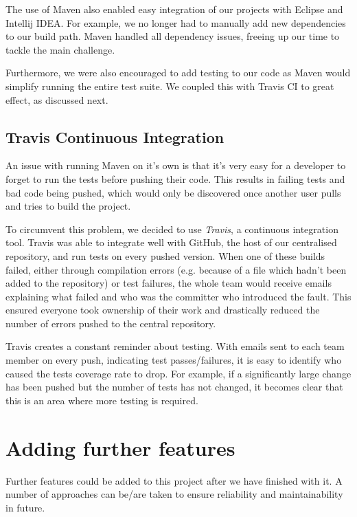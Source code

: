 \documentclass[a4paper]{article}
\begin{document}
The use of Maven also enabled easy integration of our projects with Eclipse and Intellij IDEA. For example, we no longer had to manually add new dependencies to our build path. Maven handled all dependency issues, freeing up our time to tackle the main challenge.

Furthermore, we were also encouraged to add testing to our code as Maven would
simplify running the entire test suite. We coupled this with Travis CI to great effect,
as discussed next.

\subsection{Travis Continuous Integration}

An issue with running Maven on it's own is that it's very easy for a developer
to forget to run the tests before pushing their code. This results in failing tests 
and bad code being pushed, which would only be discovered once another user pulls and tries to build the project.

To circumvent this problem, we decided to use \emph{Travis}, a continuous
integration tool. Travis was able to integrate well with GitHub, the host of our centralised repository, and run tests on every pushed version. When one
of these builds failed, either through compilation errors (e.g. because of a file which
hadn't been added to the repository) or test failures, the whole team would receive
emails explaining what failed and who was the committer who introduced the fault.
This ensured everyone took ownership of their work and drastically reduced the 
number of errors pushed to the central repository.

Travis creates a constant reminder about testing. With emails
sent to each team member on every push, indicating test passes/failures, it is
easy to identify who caused the tests coverage rate to drop. For example, if
a significantly large change has been pushed but the number
of tests has not changed, it becomes clear that this is an area where more testing
is required.

\section{Adding further features}

Further features could be added to this project after we have finished with it.
A number of approaches can be/are taken to ensure reliability and maintainability
in future.
\end{document}
